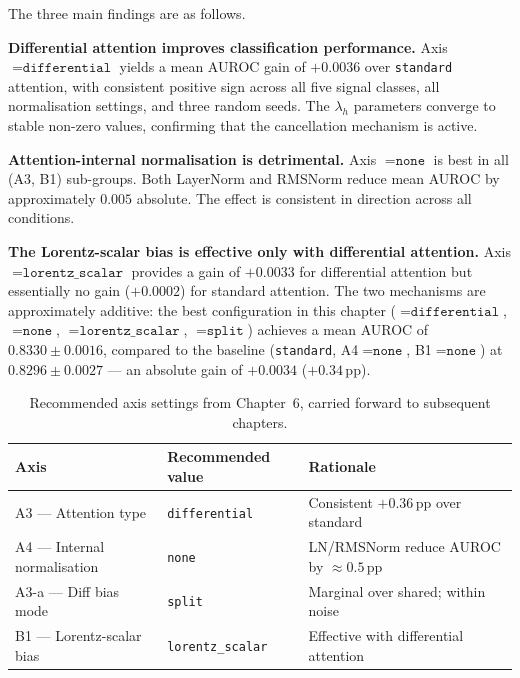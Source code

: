The three main findings are as follows.

\textbf{Differential attention improves classification performance.}
Axis ${}=\texttt{differential}$ yields a mean AUROC gain of
$+0.0036$ over \texttt{standard} attention, with consistent positive sign
across all five signal classes, all normalisation settings, and three random
seeds. The $\lambda_h$ parameters converge to stable non-zero values, confirming
that the cancellation mechanism is active.

\textbf{Attention-internal normalisation is detrimental.}
Axis ${}=\texttt{none}$ is best in all (A3, B1) sub-groups.
Both LayerNorm and RMSNorm reduce mean AUROC by approximately $0.005$ absolute.
The effect is consistent in direction across all conditions.

\textbf{The Lorentz-scalar bias is effective only with differential attention.}
Axis ${}=\texttt{lorentz\_scalar}$ provides a gain of $+0.0033$
for differential attention but essentially no gain ($+0.0002$) for standard attention.
The two mechanisms are approximately additive: the best configuration in this chapter
(${}=\texttt{differential}$, ${}=\texttt{none}$,
${}=\texttt{lorentz\_scalar}$, ${}=\texttt{split}$)
achieves a mean AUROC of $0.8330 \pm 0.0016$, compared to the baseline
(\texttt{standard}, A4${}=\texttt{none}$, B1${}=\texttt{none}$) at
$0.8296 \pm 0.0027$ — an absolute gain of $+0.0034$ ($+0.34$\,pp).

\begin{table}[h]
\centering\small
\begin{tabular}{lll}
\toprule
Axis & Recommended value & Rationale \\
\midrule
A3 — Attention type          & \texttt{differential} & Consistent $+0.36$\,pp over standard \\
A4 — Internal normalisation  & \texttt{none}         & LN/RMSNorm reduce AUROC by $\approx 0.5$\,pp \\
A3-a — Diff bias mode        & \texttt{split}        & Marginal over shared; within noise \\
B1 — Lorentz-scalar bias     & \texttt{lorentz\_scalar} & Effective with differential attention \\
\bottomrule
\end{tabular}
\caption{Recommended axis settings from Chapter~6, carried forward to subsequent chapters.}
\label{tab:ch6_recommendations}
\end{table}
